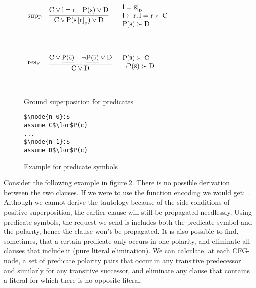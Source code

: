 \begin{figure}
$
\begin{array}[c]{llll}
\vspace{10pt}
\mathrm{sup_{P}} &\vcenter{
	\infer[]
		{\m{C \lor P(\termRepAt{\tup{s}}{r}{p}) \lor D}}
		{
			\m{C \lor \underline{l}=r} & 
			\m{\fa{P}{s} \lor D}
		}
} & 
\parbox[c][2cm]{3cm}{\m{l = \termAt{\tup{s}}{p}}\\\m{l \succ r,l=r \succ C}\\\m{\fa{P}{s} \succ D}}\\
\vspace{10pt}
\mathrm{res_{P}} &\vcenter{
	\infer[]
		{\m{C \lor D}}
		{
			\m{C \lor \underline{\fa{P}{s}}} & 
			\m{\lnot \underline{\fa{P}{s}} \lor D}
		}
} & 
\parbox[c][2cm]{3cm}{\m{\fa{P}{s} \succ C}\\\m{\lnot \fa{P}{s} \succ D}}\\
\end{array}
$
\caption{Ground superposition for predicates}
\label{GSP_Predicate}
\end{figure}


\begin{figure}
\begin{lstlisting}
$\node{n_0}:$
assume C$\lor$P(c)
...
$\node{n_1}:$
assume D$\lor$P(c)
\end{lstlisting}
\caption{Example for predicate symbols
}
\label{snippet4.1.2.3}
\end{figure}

Consider the following example in figure \ref{snippet4.1.2.3}.
There is no possible derivation between the two clauses.
If we were to use the function encoding we would get:
. 
Although we cannot derive the tautology  because of the side conditions of positive superposition, the earlier clause will still be propagated needlessly.
Using predicate symbols, the request we send is includes both the predicate symbol and the polarity, hence the clause  won't be propagated. It is also possible to find, sometimes, that a certain predicate only occurs in one polarity, and eliminate all clauses that include it (pure literal elimination).
We can calculate, at each CFG-node, a set of predicate polarity pairs that occur in any transitive predecessor and similarly for any transitive successor, and eliminate any clause that contains a literal for which there is no opposite literal.